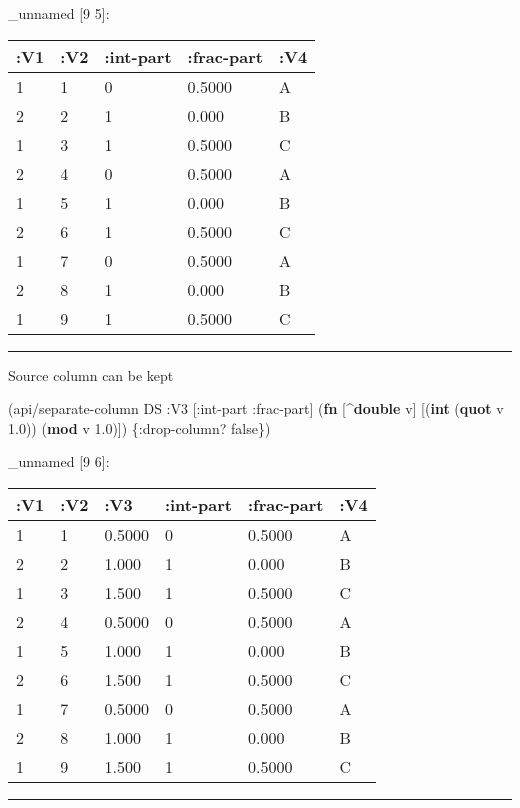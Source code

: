 \documentclass[]{article}
\newenvironment{Shaded}{\begin{snugshade}}{\end{snugshade}}
\newcommand{\KeywordTok}[1]{\textcolor[rgb]{0.13,0.29,0.53}{\textbf{#1}}}
\newcommand{\FloatTok}[1]{\textcolor[rgb]{0.00,0.00,0.81}{#1}}
\newcommand{\VariableTok}[1]{\textcolor[rgb]{0.00,0.00,0.00}{#1}}
\newcommand{\AttributeTok}[1]{\textcolor[rgb]{0.77,0.63,0.00}{#1}}
\newcommand{\NormalTok}[1]{#1}
\begin{document}
\_unnamed {[}9 5{]}:

\begin{longtable}[]{@{}lllll@{}}
\toprule
:V1 & :V2 & :int-part & :frac-part & :V4\tabularnewline
\midrule
\endhead
1 & 1 & 0 & 0.5000 & A\tabularnewline
2 & 2 & 1 & 0.000 & B\tabularnewline
1 & 3 & 1 & 0.5000 & C\tabularnewline
2 & 4 & 0 & 0.5000 & A\tabularnewline
1 & 5 & 1 & 0.000 & B\tabularnewline
2 & 6 & 1 & 0.5000 & C\tabularnewline
1 & 7 & 0 & 0.5000 & A\tabularnewline
2 & 8 & 1 & 0.000 & B\tabularnewline
1 & 9 & 1 & 0.5000 & C\tabularnewline
\bottomrule
\end{longtable}

\begin{center}\rule{0.5\linewidth}{0.5pt}\end{center}

Source column can be kept

\begin{Shaded}
\begin{Highlighting}[]
\NormalTok{(api/separate-column DS }\AttributeTok{:V3}\NormalTok{ [}\AttributeTok{:int-part} \AttributeTok{:frac-part}\NormalTok{] (}\KeywordTok{fn}\NormalTok{ [^}\KeywordTok{double}\NormalTok{ v]}
\NormalTok{                                                     [(}\KeywordTok{int}\NormalTok{ (}\KeywordTok{quot}\NormalTok{ v }\FloatTok{1.0}\NormalTok{))}
\NormalTok{                                                      (}\KeywordTok{mod}\NormalTok{ v }\FloatTok{1.0}\NormalTok{)]) \{}\AttributeTok{:drop-column}\NormalTok{? }\VariableTok{false}\NormalTok{\})}
\end{Highlighting}
\end{Shaded}

\_unnamed {[}9 6{]}:

\begin{longtable}[]{@{}llllll@{}}
\toprule
:V1 & :V2 & :V3 & :int-part & :frac-part & :V4\tabularnewline
\midrule
\endhead
1 & 1 & 0.5000 & 0 & 0.5000 & A\tabularnewline
2 & 2 & 1.000 & 1 & 0.000 & B\tabularnewline
1 & 3 & 1.500 & 1 & 0.5000 & C\tabularnewline
2 & 4 & 0.5000 & 0 & 0.5000 & A\tabularnewline
1 & 5 & 1.000 & 1 & 0.000 & B\tabularnewline
2 & 6 & 1.500 & 1 & 0.5000 & C\tabularnewline
1 & 7 & 0.5000 & 0 & 0.5000 & A\tabularnewline
2 & 8 & 1.000 & 1 & 0.000 & B\tabularnewline
1 & 9 & 1.500 & 1 & 0.5000 & C\tabularnewline
\bottomrule
\end{longtable}

\begin{center}\rule{0.5\linewidth}{0.5pt}\end{center}
\end{document}
